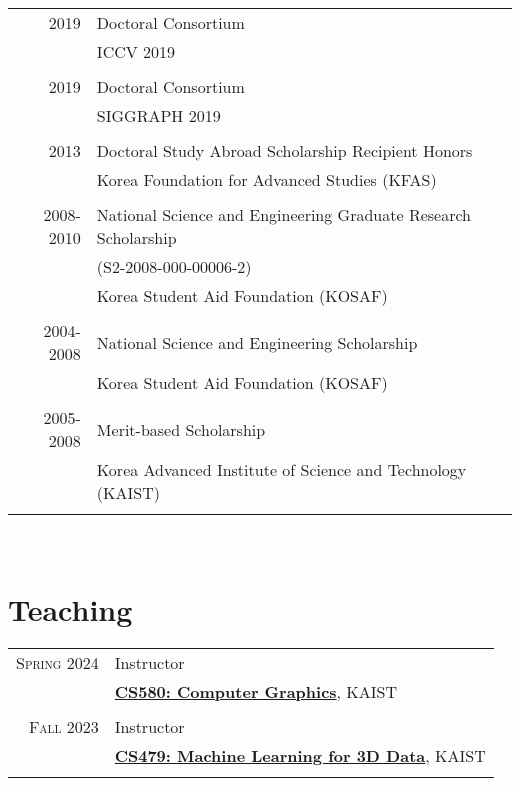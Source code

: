 \documentclass[letterpaper,10pt]{article} %
\newcommand{\blankline}{\quad\pagebreak[2]}
\begin{document}
{\begin{tabular}{r|p{11cm}}
2019 & Doctoral Consortium\\
& ICCV 2019\\
&\\
2019 & Doctoral Consortium\\
& SIGGRAPH 2019\\
&\\
2013 & Doctoral Study Abroad Scholarship Recipient Honors\\
& Korea Foundation for Advanced Studies (KFAS)\\
&\\
2008-2010 & National Science and Engineering Graduate Research Scholarship\\
& (S2-2008-000-00006-2)\\
& Korea Student Aid Foundation (KOSAF)\\
&\\
2004-2008 & National Science and Engineering Scholarship \\
& Korea Student Aid Foundation (KOSAF)\\
&\\
2005-2008 & Merit-based Scholarship\\
& Korea Advanced Institute of Science and Technology (KAIST)\\
&\\
\end{tabular}\\

\blankline



\section{Teaching}

\begin{tabular}{r|p{11cm}}

\textsc{Spring 2024} & Instructor\\
& \href{https://mhsung.github.io/kaist-cs580-spring-2024/}{\textbf{CS580: Computer Graphics}}, KAIST\\
& \\


\textsc{Fall 2023} & Instructor\\
& \href{https://mhsung.github.io/kaist-cs479-fall-2023/}{\textbf{CS479: Machine Learning for 3D Data}}, KAIST\\
& \\


\end{tabular}}
\end{document}
